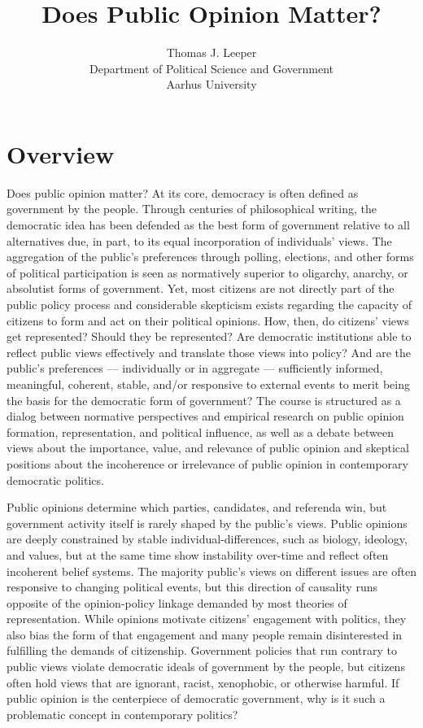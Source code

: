 \documentclass[12pt,a4paper]{article}
\title{Does Public Opinion Matter?}
\author{Thomas J. Leeper\\
Department of Political Science and Government\\
Aarhus University}
\begin{document}
\nobibliography*

\maketitle

\faketableofcontents

\section{Overview}

Does public opinion matter? At its core, democracy is often defined as government by the people. Through centuries of philosophical writing, the democratic idea has been defended as the best form of government relative to all alternatives due, in part, to its equal incorporation of individuals' views. The aggregation of the public's preferences through polling, elections, and other forms of political participation is seen as normatively superior to oligarchy, anarchy, or absolutist forms of government. Yet, most citizens are not directly part of the public policy process and considerable skepticism exists regarding the capacity of citizens to form and act on their political opinions. How, then, do citizens' views get represented? Should they be represented? Are democratic institutions able to reflect public views effectively and translate those views into policy? And are the public's preferences --- individually or in aggregate --- sufficiently informed, meaningful, coherent, stable, and/or responsive to external events to merit being the basis for the democratic form of government? The course is structured as a dialog between normative perspectives and empirical research on public opinion formation, representation, and political influence, as well as a debate between views about the importance, value, and relevance of public opinion and skeptical positions about the incoherence or irrelevance of public opinion in contemporary democratic politics.

Public opinions determine which parties, candidates, and referenda win, but government activity itself is rarely shaped by the public's views. Public opinions are deeply constrained by stable individual-differences, such as biology, ideology, and values, but at the same time show instability over-time and reflect often incoherent belief systems. The majority public's views on different issues are often responsive to changing political events, but this direction of causality runs opposite of the opinion-policy linkage demanded by most theories of representation. While opinions motivate citizens' engagement with politics, they also bias the form of that engagement and many people remain disinterested in fulfilling the demands of citizenship. Government policies that run contrary to public views violate democratic ideals of government by the people, but citizens often hold views that are ignorant, racist, xenophobic, or otherwise harmful. If public opinion is the centerpiece of democratic government, why is it such a problematic concept in contemporary politics?
\end{document}
